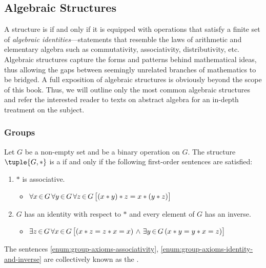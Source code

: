 \newpage
\subsection{Algebraic Structures}
A structure is  if and only if it is equipped with operations that satisfy
a finite set of \emph{algebraic identities}---statements that resemble the laws of arithmetic and
elementary algebra such as commutativity, associativity, distributivity, etc.
Algebraic structures capture the forms and patterns behind mathematical ideas, thus allowing the gaps
between seemingly unrelated branches of mathematics to be bridged.
A full exposition of algebraic structures is obviously beyond the scope of this book.
Thus, we will outline only the most common algebraic structures and refer the interested reader to texts on abstract algebra
for an in-depth treatment on the subject.

\subsubsection{Groups}
\begin{dfn}
    \label{dfn:group}
    Let \( G \) be a non-empty set and  be a binary operation on \( G \). The structure
    \( \tuple{G, \ast} \) is a  if and only if the following first-order sentences
    are satisfied:
    \begin{enumerate}[topsep=2pt,noitemsep,label=\textup{\texttt{(\alph*)}}]
        \item \( \ast \) is associative.
            \begin{itemize}
                \item \( \forall x\,{\in}\,G \, \forall y\,{\in}\,G \, \forall z\,{\in}\,G \,
                    \big[ \mleft( x \ast y \mright) \ast z = x \ast \mleft( y \ast z \mright) \big] \)
            \end{itemize}
            \label{enum:group-axioms-associativity}
        \item \( G \) has an identity with respect to \( \ast \) and every element of \( G \) has an inverse.
            \begin{itemize}
                \item \( \exists z\,{\in}\,G \, \forall x\,{\in}\,G \, \big[ \mleft( x \ast z = z \ast x = x \mright)
                        \,\,{\land}\,\,
                        \exists y\,{\in}\,G \, \mleft( x \ast y = y \ast x = z \mright) \big] \)
            \end{itemize}
            \label{enum:group-axioms-identity-and-inverse}
    \end{enumerate}
    The sentences \ref{enum:group-axioms-associativity}, \ref{enum:group-axioms-identity-and-inverse} are collectively known as the .
\end{dfn}

